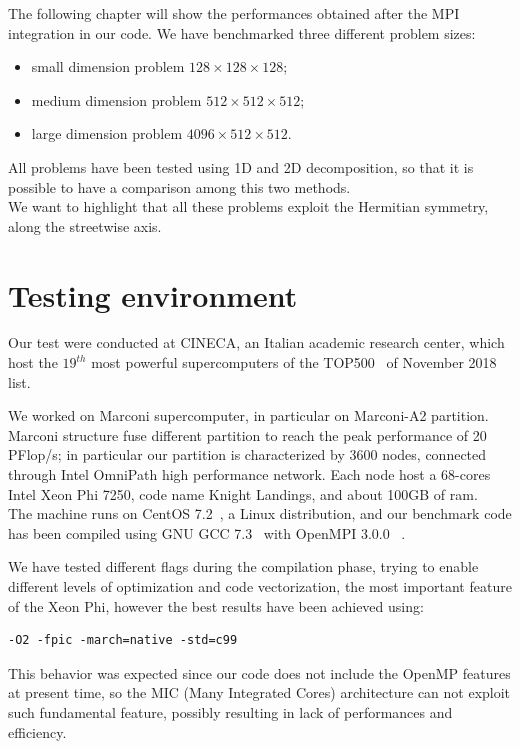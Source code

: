 The following chapter will show the performances obtained after the MPI integration in our code.
We have benchmarked three different problem sizes:
\begin{itemize}
\item small dimension problem $128\times 128 \times 128$;
\item medium dimension problem $512\times 512\times 512$;
\item large dimension problem $4096\times 512\times 512$.  
\end{itemize}
All problems have been tested using 1D and 2D decomposition, so that it is possible to have a comparison among this two methods.
\\
We want to highlight that all these problems exploit the Hermitian symmetry, along the streetwise axis.
\section{Testing environment}
Our test were conducted at CINECA\cite{Cineca}, an Italian academic research center, which host the $19^{th}$ most powerful supercomputers of the TOP500~\cite{top500} of November 2018 list.

We worked on Marconi\cite{marconi:specs} supercomputer, in particular on Marconi-A2 partition.
Marconi structure fuse different partition to reach the peak performance of 20 PFlop/s; in particular our partition is characterized by 3600 nodes, connected through Intel OmniPath\cite{intel:intelmpivsopenmpi} high performance network. Each node host a 68-cores Intel Xeon Phi 7250, code name Knight Landings, and about 100GB of ram. \\
The machine runs on CentOS 7.2~\cite{centos}, a Linux distribution, and our benchmark code has been compiled using GNU GCC 7.3~\cite{gcc} with OpenMPI 3.0.0~\cite{openmpi}\cite{MPI:standard3} . \\
\par
We have tested different flags during the compilation phase, trying to enable different levels of optimization and code vectorization, the most important feature of the Xeon Phi, however the best results have been achieved using:
\begin{lstlisting}
-O2 -fpic -march=native -std=c99
\end{lstlisting}
This behavior was expected since our code does not include the OpenMP\cite{openmp} features at present time, so the MIC\cite{mic} (Many Integrated Cores) architecture can not exploit such fundamental feature, possibly resulting in lack of performances and efficiency.



